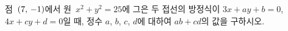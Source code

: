 점~$(7,\mkern3mu -1)$에서 원~$x^2+y^2=25$에 그은 두 접선의 방정식이 $3x+ay+b=0$, $4x+cy+d=0$일 때, 정수 $a$, $b$, $c$, $d$에 대하여 $ab+cd$의 값을 구하시오.
